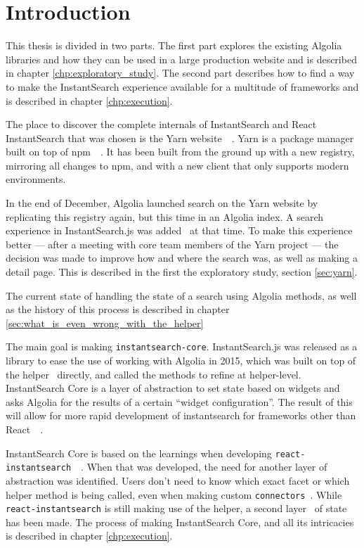 
\chapter{Introduction} %
\label{chp:introduction}

This thesis is divided in two parts. The first part explores the existing Algolia libraries and how they can be used in a large production website and is described in chapter \ref{chp:exploratory_study}. The second part describes how to find a way to make the InstantSearch experience available for a multitude of frameworks and is described in chapter \ref{chp:execution}.

The place to discover the complete internals of InstantSearch and React InstantSearch that was chosen is the Yarn website~\cite{yarn-site}~. Yarn is a package manager built on top of npm~\cite{npm-github}~. It has been built from the ground up with a new registry, mirroring all changes to npm, and with a new client that only supports modern environments.

In the end of December, Algolia launched search on the Yarn website by replicating this registry again, but this time in an Algolia index. A search experience in InstantSearch.js was added~\cite{yarn-pr-add-algolia} at that time. To make this experience better --- after a meeting with core team members of the Yarn project --- the decision was made to improve how and where the search was, as well as making a detail page. This is described in the first the exploratory study, section \ref{sec:yarn}.

The current state of handling the state of a search using Algolia methods, as well as the history of this process is described in chapter \ref{sec:what_is_even_wrong_with_the_helper}

The main goal is making {\tt instantsearch-core}. InstantSearch.js was released as a library to ease the use of working with Algolia in 2015, which was built on top of the helper~\cite{algolia-js-helper} directly, and called the methods to refine at helper-level. InstantSearch Core is a layer of abstraction to set state based on widgets and asks Algolia for the results of a certain ``widget configuration''. The result of this will allow for more rapid development of instantsearch for frameworks other than React~\cite{react-doc}~.

InstantSearch Core is based on the learnings when developing {\tt react-instantsearch}~\cite{react-instantsearch}~.  When that was developed, the need for another layer of abstraction was identified. Users don't need to know which exact facet or which helper method is being called, even when making custom {\tt connectors}\cite{react-instantsearch-connectors}~. While {\tt react-instantsearch} is still making use of the helper, a second layer~\cite{react-instantsearch-search-state} of state has been made. The process of making InstantSearch Core, and all its intricacies is described in chapter \ref{chp:execution}.
